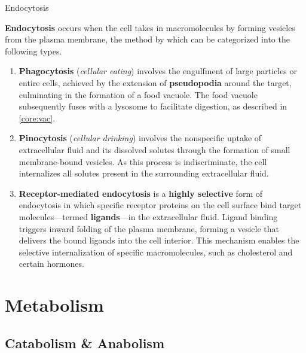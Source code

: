 \documentclass[10pt]{article}
\begin{document}
    \begin{core}[label=core:endocytosis]{Endocytosis}

      \textbf{Endocytosis} occurs when the cell takes in macromolecules by forming vesicles from the plasma membrane, the method by which can be categorized into the following types.


      \begin{enumerate}

        \item \textbf{Phagocytosis} (\textit{cellular eating}) involves the engulfment of large particles or entire cells, achieved by the extension of \textbf{pseudopodia} around the target, culminating in the formation of a food vacuole. The food vacuole subsequently fuses with a lysosome to facilitate digestion, as described in \autoref{core:vac}.

        \item \textbf{Pinocytosis} (\textit{cellular drinking}) involves the nonspecific uptake of extracellular fluid and its dissolved solutes through the formation of small membrane-bound vesicles. As this process is indiscriminate, the cell internalizes all solutes present in the surrounding extracellular fluid.

        \item \textbf{Receptor-mediated endocytosis} is a \textbf{highly selective} form of endocytosis in which specific receptor proteins on the cell surface bind target molecules---termed \textbf{ligands}---in the extracellular fluid. Ligand binding triggers inward folding of the plasma membrane, forming a vesicle that delivers the bound ligands into the cell interior. This mechanism enables the selective internalization of specific macromolecules, such as cholesterol and certain hormones.

      \end{enumerate}

    \end{core}

\section{Metabolism}

  \subsection{Catabolism \& Anabolism}
\end{document}
